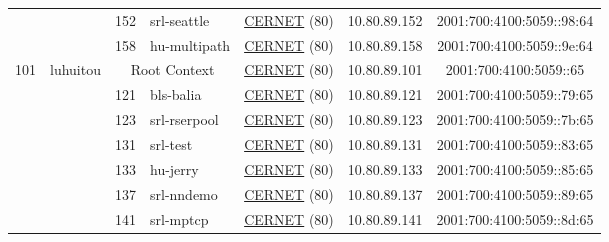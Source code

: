 \begin{small}
\begin{center}
\begin{longtable}{|c|c|c|c|c|c|c|c|}
  &  & \tiny{152} & \multicolumn{1}{|l|}{\tiny{srl-seattle}} & \multicolumn{2}{|c|}{\tiny{\href{http://www.cernet.edu.cn}{CERNET} (80)}} & \tiny{10.80.89.152} & \tiny{2001:700:4100:5059::98:64} \\* \cline{3-3}\cline{4-4}\cline{5-5}\cline{6-6}\cline{7-7}\cline{8-8}
  &  & \tiny{158} & \multicolumn{1}{|l|}{\tiny{hu-multipath}} & \multicolumn{2}{|c|}{\tiny{\href{http://www.cernet.edu.cn}{CERNET} (80)}} & \tiny{10.80.89.158} & \tiny{2001:700:4100:5059::9e:64} \\ \hline
 \multirow{9}{*}{\tiny{101}} & \multicolumn{1}{|l|}{\multirow{9}{*}{\tiny{luhuitou}}} & \multicolumn{2}{|c|}{\tiny{Root Context}} & \multicolumn{2}{|c|}{\tiny{\href{http://www.cernet.edu.cn}{CERNET} (80)}} & \tiny{10.80.89.101} & \tiny{2001:700:4100:5059::65} \\* \cline{3-3}\cline{4-4}\cline{5-5}\cline{6-6}\cline{7-7}\cline{8-8}
  &  & \tiny{121} & \multicolumn{1}{|l|}{\tiny{bls-balia}} & \multicolumn{2}{|c|}{\tiny{\href{http://www.cernet.edu.cn}{CERNET} (80)}} & \tiny{10.80.89.121} & \tiny{2001:700:4100:5059::79:65} \\* \cline{3-3}\cline{4-4}\cline{5-5}\cline{6-6}\cline{7-7}\cline{8-8}
  &  & \tiny{123} & \multicolumn{1}{|l|}{\tiny{srl-rserpool}} & \multicolumn{2}{|c|}{\tiny{\href{http://www.cernet.edu.cn}{CERNET} (80)}} & \tiny{10.80.89.123} & \tiny{2001:700:4100:5059::7b:65} \\* \cline{3-3}\cline{4-4}\cline{5-5}\cline{6-6}\cline{7-7}\cline{8-8}
  &  & \tiny{131} & \multicolumn{1}{|l|}{\tiny{srl-test}} & \multicolumn{2}{|c|}{\tiny{\href{http://www.cernet.edu.cn}{CERNET} (80)}} & \tiny{10.80.89.131} & \tiny{2001:700:4100:5059::83:65} \\* \cline{3-3}\cline{4-4}\cline{5-5}\cline{6-6}\cline{7-7}\cline{8-8}
  &  & \tiny{133} & \multicolumn{1}{|l|}{\tiny{hu-jerry}} & \multicolumn{2}{|c|}{\tiny{\href{http://www.cernet.edu.cn}{CERNET} (80)}} & \tiny{10.80.89.133} & \tiny{2001:700:4100:5059::85:65} \\* \cline{3-3}\cline{4-4}\cline{5-5}\cline{6-6}\cline{7-7}\cline{8-8}
  &  & \tiny{137} & \multicolumn{1}{|l|}{\tiny{srl-nndemo}} & \multicolumn{2}{|c|}{\tiny{\href{http://www.cernet.edu.cn}{CERNET} (80)}} & \tiny{10.80.89.137} & \tiny{2001:700:4100:5059::89:65} \\* \cline{3-3}\cline{4-4}\cline{5-5}\cline{6-6}\cline{7-7}\cline{8-8}
  &  & \tiny{141} & \multicolumn{1}{|l|}{\tiny{srl-mptcp}} & \multicolumn{2}{|c|}{\tiny{\href{http://www.cernet.edu.cn}{CERNET} (80)}} & \tiny{10.80.89.141} & \tiny{2001:700:4100:5059::8d:65} \\* \cline{3-3}\cline{4-4}\cline{5-5}\cline{6-6}\cline{7-7}\cline{8-8}

\end{longtable}
\end{center}
\end{small}
